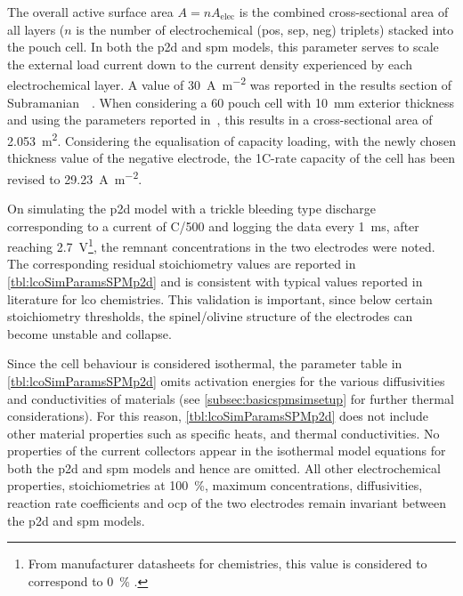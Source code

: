 The  overall  active  surface  area  $A  =  n  A_\text{elec}$  is  the  combined
cross-sectional area of  all layers ($n$ is the number  of electrochemical (pos,
sep,  neg)  triplets)  stacked  into  the pouch  cell.  In  both  the  \gls{p2d}
and  \gls{spm}  models,  this  parameter  serves  to  scale  the  external  load
current  down  to  the  current  density  experienced  by  each  electrochemical
layer. A value of  \approx\SI{30}{\ampere\per\meter\squared} was reported in the
results section of  Subramanian~\etal{}~\cite{Subramanian2009}. When considering
a  \SI{60}{\amphour} pouch  cell with  \SI{10}{\milli\meter} exterior  thickness
and  using  the  parameters  reported  in~\cite{Subramanian2009},  this  results
in  a cross-sectional  area of  \SI{2.053}{\meter\squared}.  Considering  the
equalisation of capacity  loading, with the newly chosen thickness  value of the
negative  electrode, the  1C-rate  capacity  of the  cell  has  been revised  to
\SI{29.23}{\ampere\per\meter\squared}.

On  simulating  the \gls{p2d}  model  with  a  trickle bleeding  type  discharge
corresponding   to   a  current   of   C/500   and   logging  the   data   every
\SI{1}{\milli\second}, after reaching \SI{2.7}{\volt}\footnote{From manufacturer
datasheets  for   chemistries,  this value  is considered  to
correspond to \SI{0}{\percent} .}, the remnant concentrations
in  the two  electrodes  were noted.  The  corresponding residual  stoichiometry
values  are reported  in \cref{tbl:lcoSimParamsSPMp2d}  and  is consistent  with
typical values reported in literature for \gls{lco} chemistries.  This validation is  important, since below  certain stoichiometry
thresholds, the spinel/olivine  structure of the electrodes  can become unstable
and collapse.

Since   the   cell   behaviour   is   considered   isothermal,   the   parameter
table     in \cref{tbl:lcoSimParamsSPMp2d}     omits     activation     energies
for    the   various    diffusivities    and    conductivities   of    materials
(see \cref{subsec:basicspmsimsetup}  for  further thermal  considerations).  For
this  reason, \cref{tbl:lcoSimParamsSPMp2d}  does  not  include  other  material
properties such  as specific  heats, and  thermal conductivities.  No properties
of  the  current  collectors  appear  in  the  isothermal  model  equations  for
both  the \gls{p2d}  and  \gls{spm}  models and  hence  are  omitted. All  other
electrochemical  properties,   \viz{}  stoichiometries   at  \SI{100}{\percent},
maximum concentrations, diffusivities, reaction  rate coefficients and \gls{ocp}
of  the two  electrodes remain  invariant  between the  \gls{p2d} and  \gls{spm}
models. \nopagebreak[4]

